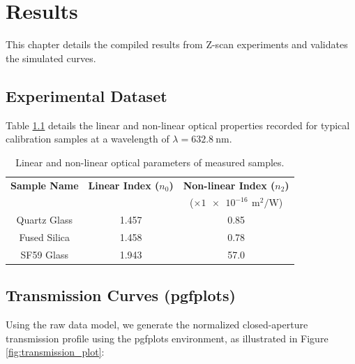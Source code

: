 \chapter{Results}
\label{ch:results}

This chapter details the compiled results from Z-scan experiments and validates the simulated curves.

\section{Experimental Dataset}
Table \ref{tab:material_properties} details the linear and non-linear optical properties recorded for typical calibration samples at a wavelength of $\lambda = \SI{632.8}{\nano\meter}$.

\begin{table}[htbp]
    \centering
    \caption{Linear and non-linear optical parameters of measured samples.}
    \label{tab:material_properties}
    \begin{tabular}{ccc}
        \toprule
        \textbf{Sample Name} & \textbf{Linear Index ($n_0$)} & \textbf{Non-linear Index ($n_2$)} \\
         & & ($\times \num{1e-16}\,\SI{}{\meter\squared\per\watt}$) \\
        \midrule
        Quartz Glass & \num{1.457} & \num{0.85} \\
        Fused Silica & \num{1.458} & \num{0.78} \\
        SF59 Glass   & \num{1.943} & \num{57.0} \\
        \bottomrule
    \end{tabular}
\end{table}

\section{Transmission Curves (pgfplots)}
Using the raw data model, we generate the normalized closed-aperture transmission profile using the \textsf{pgfplots} environment, as illustrated in Figure \ref{fig:transmission_plot}:

